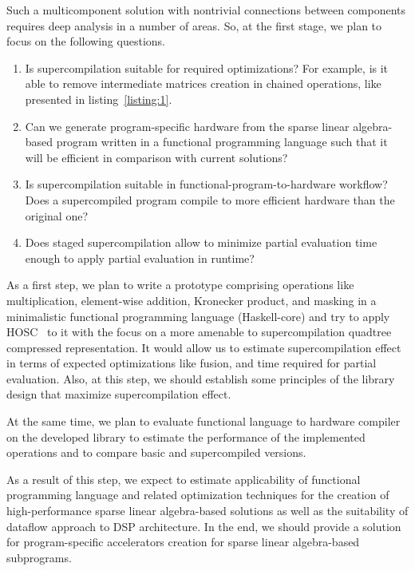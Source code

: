\documentclass[10pt,conference]{IEEEtran}
\begin{document}
Such a multicomponent solution with nontrivial connections between components requires deep analysis in a number of areas.
So, at the first stage, we plan to focus on the following questions.
\begin{enumerate}
  \item Is supercompilation suitable for required optimizations? For example, is it able to remove intermediate matrices creation in chained operations, like presented in listing~\ref{listing:1}.
  \item Can we generate program-specific hardware from the sparse linear algebra-based program written in a functional programming language such that it will be efficient in comparison with current solutions?
  \item Is supercompilation suitable in functional-program-to-hardware workflow? Does a supercompiled program compile to more efficient hardware than the original one?
  \item Does staged supercompilation allow to minimize partial evaluation time enough to apply partial evaluation in runtime? 
\end{enumerate}

As a first step, we plan to write a prototype comprising operations like multiplication, element-wise addition, Kronecker product, and masking in a minimalistic functional programming language (Haskell-core) and try to apply HOSC~\cite{hosc} to it with the focus on a more amenable to supercompilation quadtree compressed representation. 
It would allow us to estimate supercompilation effect in terms of expected optimizations like fusion, and time required for partial evaluation. 
Also, at this step, we should establish some principles of the library design that maximize supercompilation effect.

At the same time, we plan to evaluate functional language to hardware compiler~\cite{funcHLS} on the developed library to estimate the performance of the implemented operations and to compare basic and supercompiled versions.

As a result of this step, we expect to estimate applicability of functional programming language and related optimization techniques for the creation of high-performance sparse linear algebra-based solutions as well as the suitability of dataflow approach to DSP architecture. 
In the end, we should provide a solution for program-specific accelerators creation for sparse linear algebra-based subprograms. 
\end{document}

